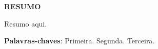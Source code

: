 \vfill
\begin{center}
{\textbf{RESUMO}\\}
\end{center}
\noindent

Resumo aqui.

\vspace{\onelineskip}
 \noindent
 \textbf{Palavras-chaves}: Primeira. Segunda. Terceira.
